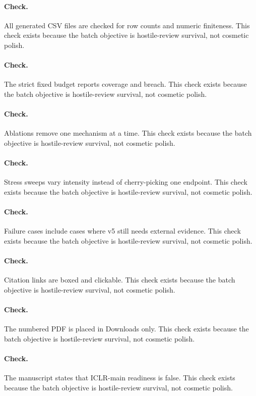 \documentclass{article}
\begin{document}
\paragraph{Check.} All generated CSV files are checked for row counts and numeric finiteness. This check exists because the batch objective is hostile-review survival, not cosmetic polish.
\paragraph{Check.} The strict fixed budget reports coverage and breach. This check exists because the batch objective is hostile-review survival, not cosmetic polish.
\paragraph{Check.} Ablations remove one mechanism at a time. This check exists because the batch objective is hostile-review survival, not cosmetic polish.
\paragraph{Check.} Stress sweeps vary intensity instead of cherry-picking one endpoint. This check exists because the batch objective is hostile-review survival, not cosmetic polish.
\paragraph{Check.} Failure cases include cases where v5 still needs external evidence. This check exists because the batch objective is hostile-review survival, not cosmetic polish.
\paragraph{Check.} Citation links are boxed and clickable. This check exists because the batch objective is hostile-review survival, not cosmetic polish.
\paragraph{Check.} The numbered PDF is placed in Downloads only. This check exists because the batch objective is hostile-review survival, not cosmetic polish.
\paragraph{Check.} The manuscript states that ICLR-main readiness is false. This check exists because the batch objective is hostile-review survival, not cosmetic polish.
\clearpage
\end{document}
